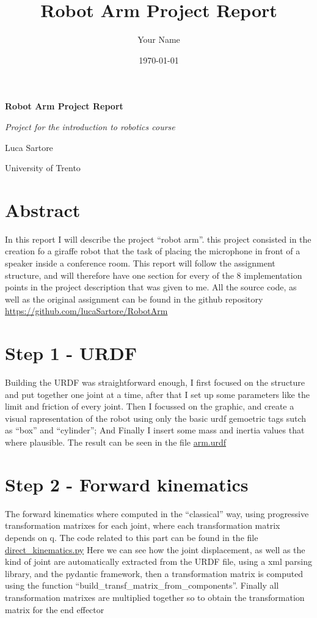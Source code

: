 \documentclass[12pt,a4paper]{article}
\title{Robot Arm Project Report}
\author{Your Name}
\date{\today}
\begin{document}
\begin{titlepage}
    \centering
    \vspace*{1cm}
    {\Huge\textbf{Robot Arm Project Report}\par}
    \vspace{2cm}
    {\Large\textit{Project for the introduction to robotics course}\par}
    \vspace{3cm}
    {\Large Luca Sartore\par}
    \vfill
    University of Trento
    \vspace{1cm}
\end{titlepage}

\tableofcontents
\newpage

\section*{Abstract}
In this report I will describe the project ``robot arm''.
this project consisted in the creation fo a giraffe robot that 
the task of placing the microphone in front of a speaker inside a conference room.
This report will follow the assignment structure, and will therefore
have one section for every of the 8 implementation points in the 
project description that was given to me.
All the source code, as well as the original assignment can be found in the 
github repository \url{https://github.com/lucaSartore/RobotArm}


\section{Step 1 - URDF}
Building the URDF was straightforward enough,
I first focused on the structure and put together one joint at a time,
after that I set up some parameters like the limit and friction of every
joint. Then I focussed on the graphic, and create a visual rapresentation
of the robot using only the basic urdf gemoetric tags sutch as ``box'' and 
``cylinder''; And Finally I insert some mass and inertia values that 
where plausible. The result can be seen in the file \href{https://github.com/lucaSartore/RobotArm/blob/master/src/robot_arm/urdf/arm.urdf}{arm.urdf}

\section {Step 2 - Forward kinematics}
The forward kinematics where computed in the ``classical'' way, using 
progressive transformation matrixes for each joint, where each transformation
matrix depends on q. The code related to this part can be found in the file
\href{https://github.com/lucaSartore/RobotArm/blob/master/src/robot_arm/src/data_processing/direct_kinematics.py}{direct\_kinematics.py}
Here we can see how the joint displacement, as well as the kind of joint are automatically
extracted from the URDF file, using a xml parsing library, and the pydantic framework, then
a transformation matrix is computed using the function ``build\_transf\_matrix\_from\_components''.
Finally all transformation matrixes are multiplied together so to obtain the transformation matrix for the end effector
\end{document}
